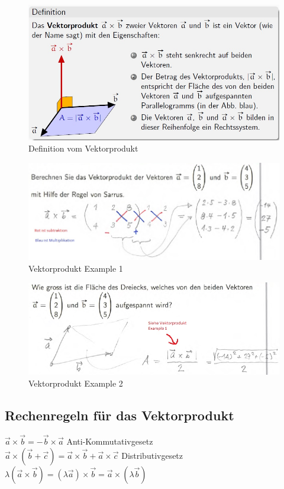 \begin{figure}[!ht]
	\centering
	\includegraphics[width=0.7\linewidth]{fig/vektorprodukt_definition}
	\caption{Definition vom Vektorprodukt}
	\label{fig:vektorprodukt_definition}
\end{figure}

\begin{figure}[!ht]
	\centering
	\includegraphics[width=0.7\linewidth]{fig/vektorprodukt_example1}
	\caption{Vektorprodukt Example 1}
	\label{fig:vektorprodukt_example1}
\end{figure}

\begin{figure}[!ht]
	\centering
	\includegraphics[width=0.7\linewidth]{fig/vektorprodukt_example2}
	\caption{Vektorprodukt Example 2}
	\label{fig:vektorprodukt_example2}
\end{figure}

\subsection{Rechenregeln für das Vektorprodukt}

\begin{math}
	\vec{a} \times \vec{b} = -\vec{b} \times \vec{a}
\end{math}
Anti-Kommutativgesetz\\
\begin{math}
	\vec{a} \times (\vec{b} + \vec{c}) = \vec{a} \times \vec{b} + \vec{a} \times \vec{c}
\end{math}
Distributivgesetz\\
\begin{math}
	\lambda (\vec{a} \times \vec{b})=
	(\lambda \vec{a}) \times \vec{b} = 
	\vec{a}  \times (\lambda \vec{b})
\end{math}

